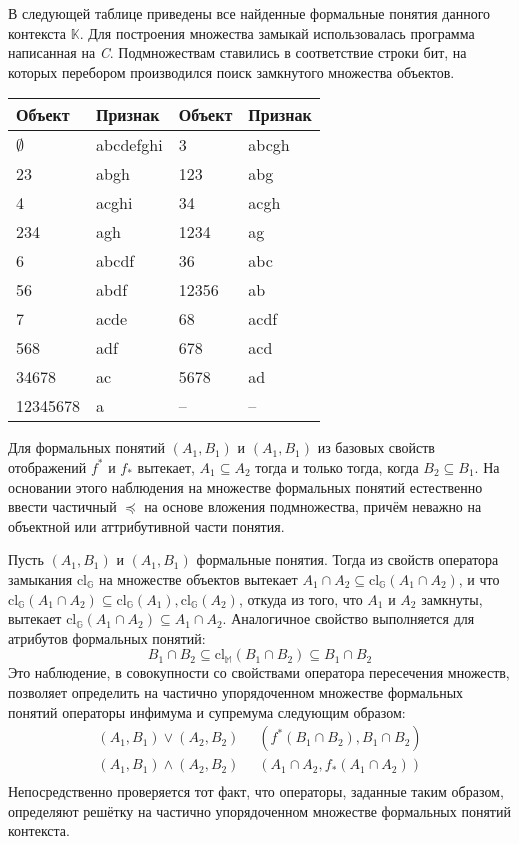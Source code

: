 \documentclass[a4paper]{article}
\newcommand{\brac}[1]{\left ( #1 \right )}
\newcommand{\defn}{\mathop{\overset{\Delta}{=}}\nolimits}
\begin{document}
В следующей таблице приведены все найденные формальные понятия данного контекста $\mathbb{K}$. Для построения множества замыкай использовалась программа написанная на \emph{C}. Подмножествам ставились в соответствие строки бит, на которых перебором производился поиск замкнутого множества объектов.\begin{center}\begin{tabular}{ l | l || l | l }
Объект & Признак & Объект & Признак \\ \hline\hline
$\emptyset$ & abcdefghi & 3 & abcgh \\ \hline
23 & abgh & 123 & abg \\ \hline
4 & acghi & 34 & acgh \\ \hline
234 & agh & 1234 & ag \\ \hline
6 & abcdf & 36 & abc \\ \hline
56 & abdf & 12356 & ab \\ \hline
7 & acde & 68 & acdf \\ \hline
568 & adf & 678 & acd \\ \hline
34678 & ac & 5678 & ad \\ \hline
12345678 & a & -- & -- \\ \hline
\end{tabular}\end{center}

Для формальных понятий $(A_1,B_1)$ и $(A_1,B_1)$ из базовых свойств отображений $f^*$ и $f_*$ вытекает, $A_1\subseteq A_2$ тогда и только тогда, когда $B_2\subseteq B_1$. На основании этого наблюдения на множестве формальных понятий естественно ввести частичный $\preceq$ на основе вложения подмножества, причём неважно на объектной или аттрибутивной части понятия. 

Пусть $(A_1,B_1)$ и $(A_1,B_1)$ формальные понятия. Тогда из свойств оператора замыкания $\text{cl}_{\mathbb{G}}$ на множестве объектов вытекает $A_1\cap A_2\subseteq \text{cl}_{\mathbb{G}}\brac{A_1\cap A_2}$, и что $\text{cl}_{\mathbb{G}}\brac{A_1\cap A_2}\subseteq \text{cl}_{\mathbb{G}}\brac{A_1}, \text{cl}_{\mathbb{G}}\brac{A_2}$, откуда из того, что $A_1$ и $A_2$ замкнуты, вытекает $\text{cl}_{\mathbb{G}}\brac{A_1\cap A_2}\subseteq A_1\cap A_2$. Аналогичное свойство выполняется для атрибутов формальных понятий: \[B_1\cap B_2 \subseteq \text{cl}_{\mathbb{M}}\brac{B_1\cap B_2} \subseteq B_1\cap B_2\] Это наблюдение, в совокупности со свойствами оператора пересечения множеств, позволяет определить на частично упорядоченном множестве формальных понятий операторы инфимума и супремума следующим образом: \begin{align*}
	\brac{A_1, B_1}\vee \brac{A_2, B_2} &\defn \brac{f^*\brac{B_1\cap B_2}, B_1\cap B_2}\\
	\brac{A_1, B_1}\wedge \brac{A_2, B_2} &\defn \brac{A_1\cap A_2, f_*\brac{A_1\cap A_2}}\\
\end{align*}
Непосредственно проверяется тот факт, что операторы, заданные таким образом, определяют решётку на частично упорядоченном множестве формальных понятий контекста.
\end{document}

